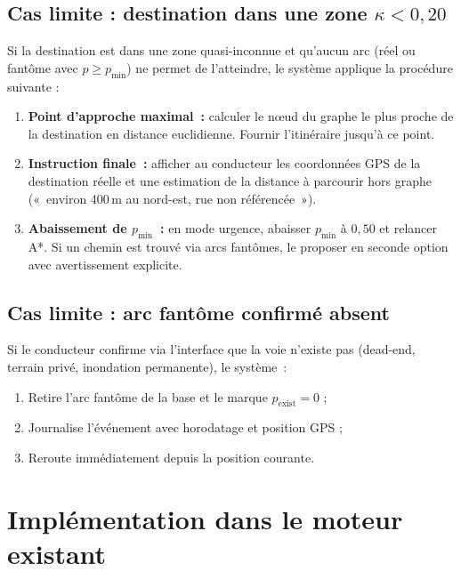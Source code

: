 \documentclass[12pt,a4paper]{article}
\theoremstyle{definition}
\theoremstyle{remark}
\begin{document}
\subsection{Cas limite : destination dans une zone $\kappa < 0{,}20$}

Si la destination est dans une zone quasi-inconnue et qu'aucun arc
(réel ou fantôme avec $p \geq p_{\min}$) ne permet de l'atteindre,
le système applique la procédure suivante :

\begin{enumerate}[leftmargin=2em, itemsep=4pt]
  \item \textbf{Point d'approche maximal~:} calculer le nœud du graphe
    le plus proche de la destination en distance euclidienne.
    Fournir l'itinéraire jusqu'à ce point.

  \item \textbf{Instruction finale~:} afficher au conducteur les
    coordonnées GPS de la destination réelle et une estimation
    de la distance à parcourir hors graphe («~environ 400\,m
    au nord-est, rue non référencée~»).

  \item \textbf{Abaissement de $p_{\min}$~:} en mode urgence, abaisser
    $p_{\min}$ à $0{,}50$ et relancer A*. Si un chemin est trouvé
    via arcs fantômes, le proposer en seconde option avec
    avertissement explicite.
\end{enumerate}

\subsection{Cas limite : arc fantôme confirmé absent}

Si le conducteur confirme via l'interface que la voie n'existe pas
(dead-end, terrain privé, inondation permanente), le système~:
\begin{enumerate}[leftmargin=2em]
  \item Retire l'arc fantôme de la base et le marque $p_\text{exist} = 0$ ;
  \item Journalise l'événement avec horodatage et position GPS ;
  \item Reroute immédiatement depuis la position courante.
\end{enumerate}

\newpage

\section{Implémentation dans le moteur existant}
\end{document}
